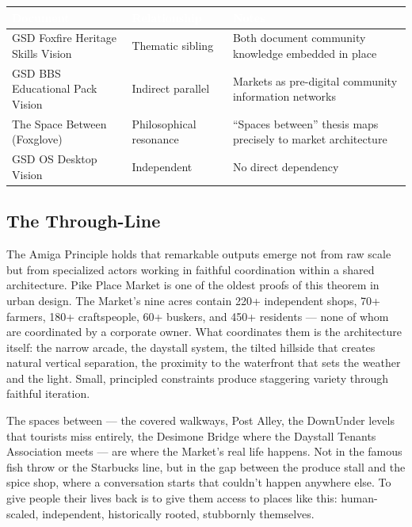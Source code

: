\documentclass[11pt,letterpaper]{article}
\newcommand{\tableheader}[1]{\textbf{\sffamily\textcolor{white}{#1}}}
\begin{document}
\begin{center}
\begin{tabularx}{\textwidth}{L{4.5cm}L{4.5cm}X}
\toprule
{}
\tableheader{Document} & \tableheader{Relationship} & \tableheader{Notes} \\
\midrule
GSD Foxfire Heritage Skills Vision & Thematic sibling & Both document community knowledge embedded in place \\
GSD BBS Educational Pack Vision & Indirect parallel & Markets as pre-digital community information networks \\
The Space Between (Foxglove) & Philosophical resonance & ``Spaces between'' thesis maps precisely to market architecture \\
GSD OS Desktop Vision & Independent & No direct dependency \\
\bottomrule
\end{tabularx}
\end{center}

\subsection{The Through-Line}

The Amiga Principle holds that remarkable outputs emerge not from raw scale but from specialized actors working in faithful coordination within a shared architecture. Pike Place Market is one of the oldest proofs of this theorem in urban design. The Market's nine acres contain 220+ independent shops, 70+ farmers, 180+ craftspeople, 60+ buskers, and 450+ residents --- none of whom are coordinated by a corporate owner. What coordinates them is the architecture itself: the narrow arcade, the daystall system, the tilted hillside that creates natural vertical separation, the proximity to the waterfront that sets the weather and the light. Small, principled constraints produce staggering variety through faithful iteration.

The spaces between --- the covered walkways, Post Alley, the DownUnder levels that tourists miss entirely, the Desimone Bridge where the Daystall Tenants Association meets --- are where the Market's real life happens. Not in the famous fish throw or the Starbucks line, but in the gap between the produce stall and the spice shop, where a conversation starts that couldn't happen anywhere else. To give people their lives back is to give them access to places like this: human-scaled, independent, historically rooted, stubbornly themselves.
\end{document}
